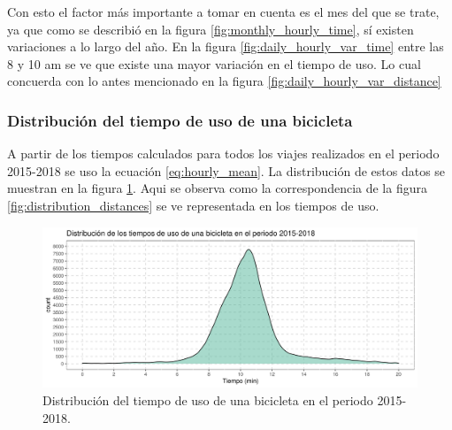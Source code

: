 Con esto el factor más importante a tomar en cuenta es el mes del que se trate, ya que como se describió en la figura \ref{fig:monthly_hourly_time}, sí existen variaciones a lo largo del año. En la figura \ref{fig:daily_hourly_var_time} entre las 8 y 10 am se ve que existe una mayor variación en el tiempo de uso. Lo cual concuerda con lo antes mencionado en la figura \ref{fig:daily_hourly_var_distance}

\subsubsection{Distribución del tiempo de uso de una bicicleta}

A partir de los tiempos calculados para todos los viajes realizados en el periodo 2015-2018 se uso la ecuación \ref{eq:hourly_mean}. La distribución de estos datos se muestran en la figura \ref{fig:distribution_times}. Aqui se observa como la correspondencia de la figura \ref{fig:distribution_distances} se ve representada en los tiempos de uso.

\begin{figure}[H]
    \centering
    \includegraphics[width=16cm]{Graphics/distribution_time_travel.png}
    \caption{Distribución del tiempo de uso de una bicicleta en el periodo 2015-2018.}
    \label{fig:distribution_times}
\end{figure}